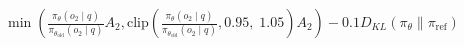 \documentclass[preview]{standalone}
\begin{document}
\begin{align*}
\min \left(\frac{\pi_\theta(o_2 \mid q)}{\pi_{\theta_{\text{old}}}(o_2 \mid q)} A_2, \text{clip} \left( \frac{\pi_\theta(o_2 \mid q)}{\pi_{\theta_{\text{old}}}(o_2 \mid q)}, 0.95,\; 1.05 \right) A_2 \right) - 0.1 D_{KL}(\pi_\theta \parallel \pi_{\text{ref}})
\end{align*}
\end{document}
